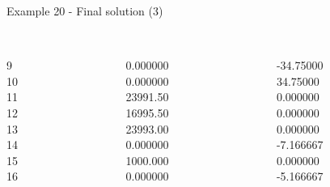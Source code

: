 \begin{frame}{Example 20 - Final solution (3)}
\footnotesize

\begin{columns}[t]
\begin{column}{0.3\textwidth}
\\
9\\
10\\
11\\
12\\
13\\
14\\
15\\
16\\
\end{column}

\begin{column}{0.3\textwidth}
\\
0.000000\\
0.000000\\
23991.50\\
16995.50\\
23993.00\\
0.000000\\
1000.000\\
0.000000\\
\end{column}

\begin{column}{0.3\textwidth}
\\
-34.75000\\
34.75000\\
0.000000\\
0.000000\\
0.000000\\
-7.166667\\
0.000000\\
-5.166667\\
\end{column}
\end{columns}

\end{frame}
